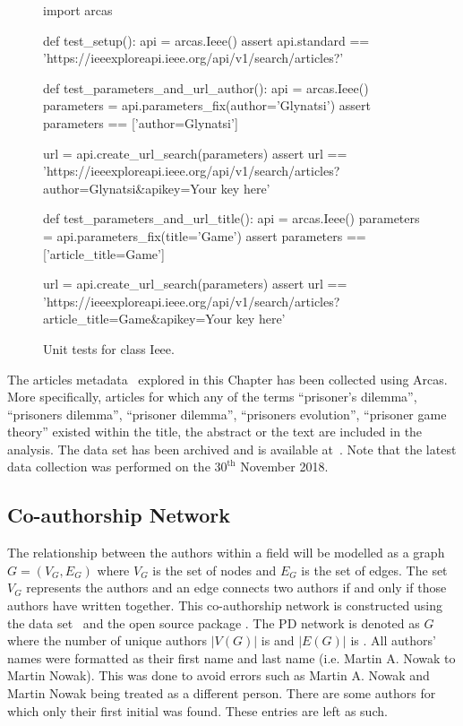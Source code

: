 \begin{figure}[!hbtp]
    \begin{sourcepy}
import arcas

def test_setup():
    api = arcas.Ieee()
    assert api.standard == 'https://ieeexploreapi.ieee.org/api/v1/search/articles?'

def test_parameters_and_url_author():
    api = arcas.Ieee()
    parameters = api.parameters_fix(author='Glynatsi')
    assert parameters == ['author=Glynatsi']

    url = api.create_url_search(parameters)
    assert url == 'https://ieeexploreapi.ieee.org/api/v1/search/articles?author=Glynatsi&apikey=Your key here'

def test_parameters_and_url_title():
    api = arcas.Ieee()
    parameters = api.parameters_fix(title='Game')
    assert parameters == ['article_title=Game']

    url = api.create_url_search(parameters)
    assert url == 'https://ieeexploreapi.ieee.org/api/v1/search/articles?article_title=Game&apikey=Your key here'
\end{sourcepy}
\caption{Unit tests for class Ieee.}\label{fig:test_ieee}
\end{figure}


The \totalarticles articles metadata~\cite{pd_data_2018} explored in this Chapter has been collected
using Arcas. More specifically, articles for which any of the terms
``prisoner's dilemma'', ``prisoners dilemma'', ``prisoner dilemma'', ``prisoners
evolution'', ``prisoner game theory'' existed within the title, the abstract or
the text are included in the analysis. The data set has been archived and is
available at~\cite{pd_data_2018}. Note that the latest data collection was
performed on the \(30^{\text{th}}\) November 2018.

\subsection{Co-authorship Network}\label{section:co_authorship_network}

The relationship between the authors within a field will be modelled as a graph
\(G = (V_G, E_G)\) where \(V_G\) is the set of nodes and \(E_G\)  is the set of
edges. The set \(V_G\) represents the authors and an edge connects two authors
if and only if those authors have written together. This co-authorship network is
constructed using the data set~\cite{pd_data_2018} and the open source package
\cite{networkx}. The PD network is denoted as \(G\) where the
number of unique authors \(|V(G)|\) is \authors and \(|E(G)|\) is \edges.
All authors' names were formatted as their first name and last name (i.e.
Martin A. Nowak to Martin Nowak). This was done to avoid errors such as Martin
A. Nowak and Martin Nowak being treated as a different person. There are some
authors for which only their first initial was found. These entries are left as
such.


